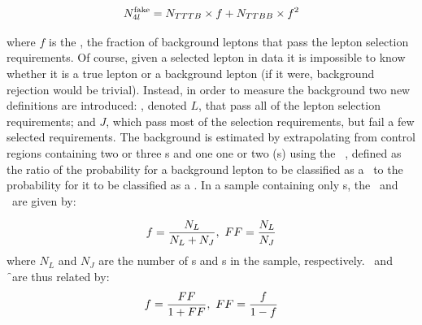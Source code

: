 \begin{equation}
N_{4l}^{\rm fake} = N_{TTTB} \times f + N_{TTBB} \times f^{2}
\label{eqn:bg-4l-true}
\end{equation}

where $f$ is the \frate, the fraction of background leptons that pass the lepton selection
requirements. Of course, given a selected lepton in data it is impossible to
know whether it is a true lepton or a background lepton (if it were, background
rejection would be trivial). Instead, in order to measure the background 
two new definitions are introduced: , denoted $L$, that
pass all of the lepton selection requirements; and  $J$, which
pass most of the selection requirements, but fail a few selected requirements.
The background is estimated by extrapolating from control regions containing
two or three \sellep s and one one or two \lljet (s) using the
\intro{\ffactor}\ \FF, defined as the ratio of the probability for a background lepton to be
classified as a \sellep\ to the probability for it to be classified as a \lljet.
In a sample containing only \bglep s, the \frate\ and \ffactor\ are given by: 

\begin{equation}
f = \frac{N_{L}}{N_{L} + N_{J}},\ FF = \frac{N_{L}}{N_{J}}
\end{equation}
where $N_{L}$ and $N_{J}$ are the number of \sellep s and \lljet s in the sample,
respectively. \FF\ and \f\ are thus related by:
\begin{equation}
f = \frac{FF}{1 + FF},\ FF = \frac{f}{1-f}
\label{eqn:bg-f-FF-relations}
\end{equation}


